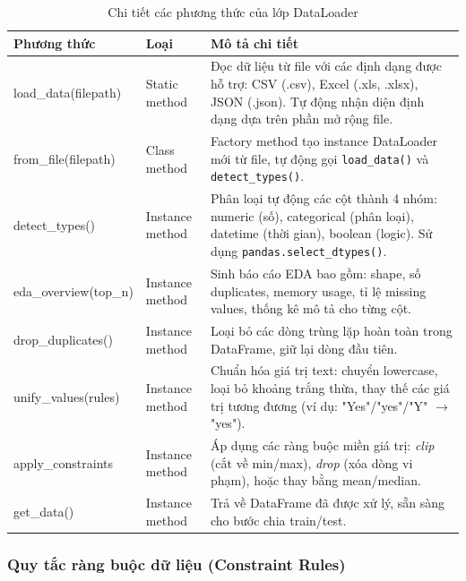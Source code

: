 \documentclass[12pt,a4paper]{article}
\begin{document}
\begin{table}[H]
\centering
\caption{Chi tiết các phương thức của lớp DataLoader}
\label{tab:dataloader_methods}

\renewcommand{\arraystretch}{1.2}

\begin{tabular}{|>{\raggedright\arraybackslash\ttfamily}p{4cm}|
                >{\raggedright\arraybackslash}p{3cm}|
                >{\raggedright\arraybackslash}p{7.5cm}|}
\hline
\textbf{Phương thức} & \textbf{Loại} & \textbf{Mô tả chi tiết} \\
\hline
load\_data(filepath) & Static method &
Đọc dữ liệu từ file với các định dạng được hỗ trợ: CSV (.csv), Excel (.xls, .xlsx), JSON (.json).
Tự động nhận diện định dạng dựa trên phần mở rộng file. \\
\hline
from\_file(filepath) & Class method &
Factory method tạo instance DataLoader mới từ file, tự động gọi \texttt{load\_data()} và \texttt{detect\_types()}. \\
\hline
detect\_types() & Instance method &
Phân loại tự động các cột thành 4 nhóm: numeric (số), categorical (phân loại), datetime (thời gian), boolean (logic).
Sử dụng \texttt{pandas.select\_dtypes()}. \\
\hline
eda\_overview(top\_n) & Instance method &
Sinh báo cáo EDA bao gồm: shape, số duplicates, memory usage, tỉ lệ missing values, thống kê mô tả cho từng cột. \\
\hline
drop\_duplicates() & Instance method &
Loại bỏ các dòng trùng lặp hoàn toàn trong DataFrame, giữ lại dòng đầu tiên. \\
\hline
unify\_values(rules) & Instance method &
Chuẩn hóa giá trị text: chuyển lowercase, loại bỏ khoảng trắng thừa, thay thế các giá trị tương đương
(ví dụ: "Yes"/"yes"/"Y" $\rightarrow$ "yes"). \\
\hline
apply\_constraints  & Instance method &
Áp dụng các ràng buộc miền giá trị: \emph{clip} (cắt về min/max), \emph{drop} (xóa dòng vi phạm),
hoặc thay bằng mean/median. \\
\hline
get\_data() & Instance method &
Trả về DataFrame đã được xử lý, sẵn sàng cho bước chia train/test. \\
\hline
\end{tabular}
\end{table}

\subsubsection{Quy tắc ràng buộc dữ liệu (Constraint Rules)}
\end{document}
